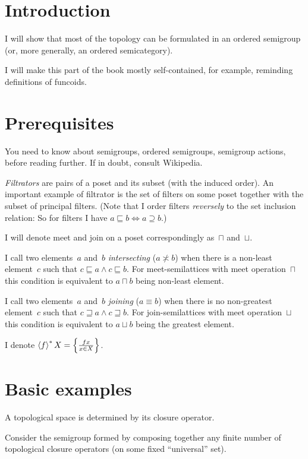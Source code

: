 \chapter{Introduction}

I will show that most of the topology can be formulated in an ordered semigroup (or, more generally, an ordered semicategory).

I will make this part of the book mostly self-contained, for example, reminding definitions of funcoids.

\chapter{Prerequisites}

You need to know about semigroups, ordered semigroups, semigroup actions, before reading further. If in doubt, consult Wikipedia.

\emph{Filtrators} are pairs of a poset and its subset (with the induced order). An important example of filtrator is the set of filters on some poset together with the subset of principal filters. (Note that I order filters \emph{reversely} to the set inclusion relation: So for filters I have $a\sqsubseteq b \Leftrightarrow a\supseteq b$.)

I will denote meet and join on a poset correspondingly as~$\sqcap$ and~$\sqcup$.

I call two elements~$a$ and~$b$ \emph{intersecting} ($a\nasymp b$) when there is a non-least element~$c$ such that $c\sqsubseteq a\land c\sqsubseteq b$. For meet-semilattices with meet operation~$\sqcap$ this condition is equivalent to $a\sqcap b$ being non-least element.

I call two elements~$a$ and~$b$ \emph{joining} ($a\equiv b$) when there is no non-greatest element~$c$ such that $c\sqsupseteq a\land c\sqsupseteq b$. For join-semilattices with meet operation~$\sqcup$ this condition is equivalent to $a\sqcup b$ being the greatest element.

I denote $\left\langle f\right\rangle ^{\ast}X = \left\{ \frac{fx}{x\in X}\right\}$.

\chapter{Basic examples}

A topological space is determined by its closure operator.

Consider the semigroup formed by composing together any finite number of topological closure operators (on some fixed ``universal'' set).

